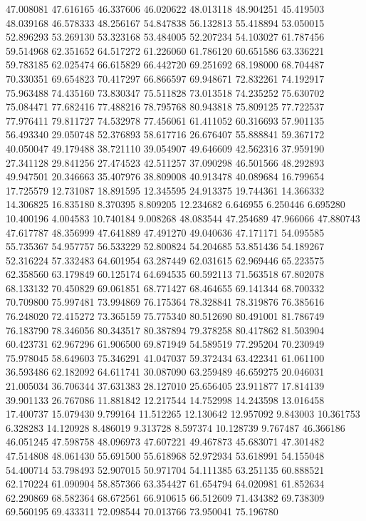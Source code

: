 47.008081
47.616165
46.337606
46.020622
48.013118
48.904251
45.419503
48.039168
46.578333
48.256167
54.847838
56.132813
55.418894
53.050015
52.896293
53.269130
53.323168
53.484005
52.207234
54.103027
61.787456
59.514968
62.351652
64.517272
61.226060
61.786120
60.651586
63.336221
59.783185
62.025474
66.615829
66.442720
69.251692
68.198000
68.704487
70.330351
69.654823
70.417297
66.866597
69.948671
72.832261
74.192917
75.963488
74.435160
73.830347
75.511828
73.013518
74.235252
75.630702
75.084471
77.682416
77.488216
78.795768
80.943818
75.809125
77.722537
77.976411
79.811727
74.532978
77.456061
61.411052
60.316693
57.901135
56.493340
29.050748
52.376893
58.617716
26.676407
55.888841
59.367172
40.050047
49.179488
38.721110
39.054907
49.646609
42.562316
37.959190
27.341128
29.841256
27.474523
42.511257
37.090298
46.501566
48.292893
49.947501
20.346663
35.407976
38.809008
40.913478
40.089684
16.799654
17.725579
12.731087
18.891595
12.345595
24.913375
19.744361
14.366332
14.306825
16.835180
8.370395
8.809205
12.234682
6.646955
6.250446
6.695280
10.400196
4.004583
10.740184
9.008268
48.083544
47.254689
47.966066
47.880743
47.617787
48.356999
47.641889
47.491270
49.040636
47.171171
54.095585
55.735367
54.957757
56.533229
52.800824
54.204685
53.851436
54.189267
52.316224
57.332483
64.601954
63.287449
62.031615
62.969446
65.223575
62.358560
63.179849
60.125174
64.694535
60.592113
71.563518
67.802078
68.133132
70.450829
69.061851
68.771427
68.464655
69.141344
68.700332
70.709800
75.997481
73.994869
76.175364
78.328841
78.319876
76.385616
76.248020
72.415272
73.365159
75.775340
80.512690
80.491001
81.786749
76.183790
78.346056
80.343517
80.387894
79.378258
80.417862
81.503904
60.423731
62.967296
61.906500
69.871949
54.589519
77.295204
70.230949
75.978045
58.649603
75.346291
41.047037
59.372434
63.422341
61.061100
36.593486
62.182092
64.611741
30.087090
63.259489
46.659275
20.046031
21.005034
36.706344
37.631383
28.127010
25.656405
23.911877
17.814139
39.901133
26.767086
11.881842
12.217544
14.752998
14.243598
13.016458
17.400737
15.079430
9.799164
11.512265
12.130642
12.957092
9.843003
10.361753
6.328283
14.120928
8.486019
9.313728
8.597374
10.128739
9.767487
46.366186
46.051245
47.598758
48.096973
47.607221
49.467873
45.683071
47.301482
47.514808
48.061430
55.691500
55.618968
52.972934
53.618991
54.155048
54.400714
53.798493
52.907015
50.971704
54.111385
63.251135
60.888521
62.170224
61.090904
58.857366
63.354427
61.654794
64.020981
61.852634
62.290869
68.582364
68.672561
66.910615
66.512609
71.434382
69.738309
69.560195
69.433311
72.098544
70.013766
73.950041
75.196780
